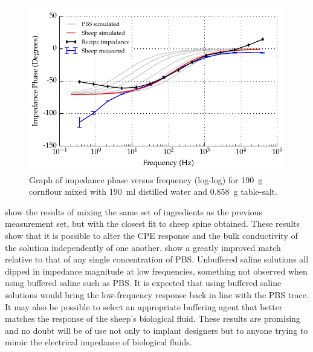   \begin{figure}
      \centering
      \includegraphics[width=\textwidth]{content/pt2/graphics/run12_190ml-distilledWater_190g-cornflour_0g858-salt_ZVsF_graph_phase}
      \caption{\label{fig:recipe_cornflour_salt_extraWater_phase_improved}Graph of impedance phase versus frequency (log-log) for \SI{190}{\gram} cornflour mixed with \SI{190}{\milli\litre} distilled water and \SI{0.858}{\gram} table-salt.}
  \end{figure}

   show the results of mixing the same set of ingredients as the previous measurement set, but with the closest fit to sheep spine obtained.
  These results show that it is possible to alter the CPE response and the bulk conductivity of the solution independently of one another.
   show a greatly improved match relative to that of any single concentration of PBS.
  Unbuffered saline solutions all dipped in impedance magnitude at low frequencies, something not observed when using buffered saline such as PBS.
  It is expected that using buffered saline solutions would bring the low-frequency response back in line with the PBS trace.
  It may also be possible to select an appropriate buffering agent that better matches the response of the sheep's biological fluid.
  These results are promising and no doubt will be of use not only to implant designers but to anyone trying to mimic the electrical impedance of biological fluids.
